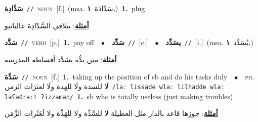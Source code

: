 \documentclass[10pt,a4paper,twoside]{article} %
\begin{document}
\begin{multicols}{2}
{\setlength\topsep{0pt}\textbf{\foreignlanguage{arabic}{سَدَّادِة}}\ {\color{gray}\texttt{//}\color{black}}\ \textsc{noun}\ [f.]\ \color{gray}(msa. \foreignlanguage{arabic}{سَدّادَة}~\foreignlanguage{arabic}{\textbf{١.}})\color{black}\ \textbf{1.}~plug\  \begin{flushright}\color{gray}\foreignlanguage{arabic}{\textbf{\underline{\foreignlanguage{arabic}{أمثلة}}}: بتلاقي السَّدّادِة عالبانيو}\end{flushright}\color{black}} \vspace{2mm}

{\setlength\topsep{0pt}\textbf{\foreignlanguage{arabic}{سَدَّد}}\ {\color{gray}\texttt{//}\color{black}}\ \textsc{verb}\ [p.]\ \textbf{1.}~pay off\ \ $\bullet$\ \ \setlength\topsep{0pt}\textbf{\foreignlanguage{arabic}{سَدِّد}}\ {\color{gray}\texttt{//}\color{black}}\ [c.]\ \ $\bullet$\ \ \setlength\topsep{0pt}\textbf{\foreignlanguage{arabic}{يسَدِّد}}\ {\color{gray}\texttt{//}\color{black}}\ [i.]\ \color{gray}(msa. \foreignlanguage{arabic}{يُسَدِّد}~\foreignlanguage{arabic}{\textbf{١.}})\color{black}\  \begin{flushright}\color{gray}\foreignlanguage{arabic}{\textbf{\underline{\foreignlanguage{arabic}{أمثلة}}}: مين بدُّه يسَدِّد أقساطه المدرسة}\end{flushright}\color{black}} \vspace{2mm}

{\setlength\topsep{0pt}\textbf{\foreignlanguage{arabic}{سَدِّة}}\ {\color{gray}\texttt{//}\color{black}}\ \textsc{noun}\ [f.]\ \textbf{1.}~taking up the position of sb and do his tasks duly\ \ $\bullet$\ \ \textsc{ph.} \color{gray} \foreignlanguage{arabic}{لَا للسدة ولَا للهدة ولَا لعثرَات الزمن}\color{black}\ {\color{gray}\texttt{/{\sffamily laː lissade wlaː lilhadde wlaː laʕaθraːt ʔizzaman}/}\color{black}}\ \textbf{1.}~sb who is totally useless (just making troubles)\  \begin{flushright}\color{gray}\foreignlanguage{arabic}{\textbf{\underline{\foreignlanguage{arabic}{أمثلة}}}: جوزها قاعد بالدار مثل العطيلة لا للسَّدِّة ولا للهَدِّة ولا لَعَثَرات الزَّمَن}\end{flushright}\color{black}} \vspace{2mm}


\end{multicols}
\end{document}
